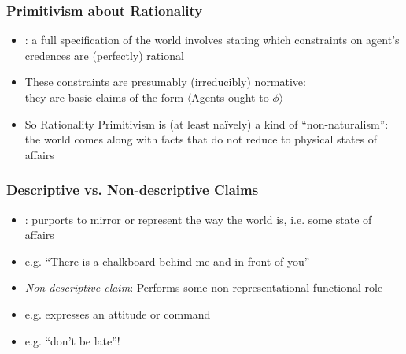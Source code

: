 \begin{frame}
\frametitle{Primitivism about Rationality}

\begin{itemize}[<+->]

\item {}: a full specification of the world involves stating which constraints on agent's credences are (perfectly) rational

\item These constraints are presumably (irreducibly) \textcolor{OGlyallpink}{normative}: \\ they are basic claims of the form $\langle$Agents \textcolor{OGlyallpink}{ought} to $\phi$$\rangle$

\item So Rationality Primitivism is (at least  na\"ively) a kind of ``non-naturalism'': the world comes along with facts that do not reduce to physical states of affairs 

\end{itemize}
\end{frame}

\begin{frame}
\frametitle{Descriptive vs. Non-descriptive Claims}

\begin{itemize}[<+->]

\item {}: purports to mirror or represent the way the world is, i.e. some state of affairs

\item[] e.g. ``There is a chalkboard behind me and in front of you''

\item \emph{Non-descriptive claim}: Performs some non-representational functional role

\item[] e.g. expresses an attitude or command

\item[] e.g. ``don't be late''! 

\end{itemize}
\end{frame}


